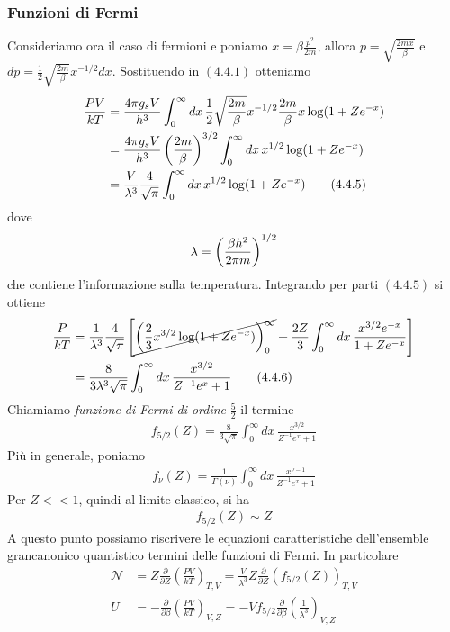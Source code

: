 \documentclass{article}
\begin{document}
\subsubsection*{Funzioni di Fermi}
Consideriamo ora il caso di fermioni e poniamo $x = \beta\frac{p^2}{2m}$, allora $p = \sqrt{\frac{2mx}{\beta}}$ e $dp = \frac{1}{2}\sqrt{\frac{2m}{\beta}}x^{-1/2}dx$. Sostituendo in $(4.4.1)$ otteniamo
\begin{align}
    \frac{PV}{kT} &= \frac{4\pi g_sV}{h^3}\int_0^\infty dx \, \frac{1}{2}\sqrt{\frac{2m}{\beta}}x^{-1/2}\frac{2m}{\beta}x\log(1 + Ze^{-x}) \notag \\
    &= \frac{4\pi g_sV}{h^3}\left(\frac{2m}{\beta}\right)^{3/2}\int_0^\infty dx \, x^{1/2}\log(1 + Ze^{-x}) \notag \\
    &= \frac{V}{\lambda^3}\frac{4}{\sqrt{\pi}}\int_0^\infty dx \, x^{1/2}\log(1 + Ze^{-x}) \tag{4.4.5}
\end{align}
dove 
\begin{align}
    \lambda = \left(\frac{\beta h^2}{2\pi m}\right)^{1/2} \notag
\end{align}
che contiene l'informazione sulla temperatura. Integrando per parti $(4.4.5)$ si ottiene
\begin{align}
    \frac{P}{kT} &= \frac{1}{\lambda^3}\frac{4}{\sqrt{\pi}}\left[\cancel{\left(\frac{2}{3}x^{3/2}\log(1 + Ze^{-x})\right)_0^\infty} + \frac{2Z}{3}\int_0^\infty dx \, \frac{x^{3/2}e^{-x}}{1 + Ze^{-x}} \right] \notag \\
    &= \frac{8}{3\lambda^3\sqrt{\pi}}\int_0^\infty dx \, \frac{x^{3/2}}{Z^{-1}e^x + 1} \tag{4.4.6}
\end{align}
Chiamiamo \textit{funzione di Fermi di ordine} $\frac{5}{2}$ il termine
\begin{align}
    f_{5/2}(Z) = \frac{8}{3\sqrt{\pi}}\int_0^\infty dx \, \frac{x^{3/2}}{Z^{-1}e^x + 1} \tag{4.4.7}
\end{align}
Più in generale, poniamo
\begin{align}
    f_\nu(Z) = \frac{1}{\Gamma(\nu)}\int_0^\infty dx \, \frac{x^{\nu - 1}}{Z^{-1}e^x + 1} \tag{4.4.8}
\end{align}
Per $Z << 1$, quindi al limite classico, si ha
\begin{align}
    f_{5/2}(Z) \sim Z \tag{4.4.9}
\end{align}
A questo punto possiamo riscrivere le equazioni caratteristiche dell'ensemble grancanonico quantistico termini delle funzioni di Fermi. In particolare
\begin{align}
    \mathcal{N} &= Z\frac{\partial}{\partial Z}\left(\frac{PV}{kT}\right)_{T, V} = \frac{V}{\lambda^3}Z\frac{\partial}{\partial Z}\left(f_{5/2}(Z)\right)_{T, V} \tag{4.4.10} \\
    U &= -\frac{\partial}{\partial \beta}\left(\frac{PV}{kT}\right)_{V, Z} = -Vf_{5/2}\frac{\partial}{\partial \beta}\left(\frac{1}{\lambda^3}\right)_{V, Z} \tag{4.4.11} 
\end{align}
\end{document}
